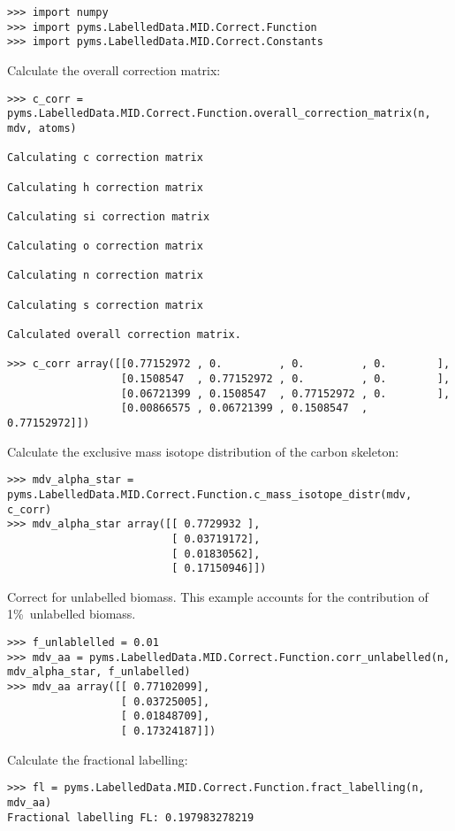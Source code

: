\begin{verbatim}
>>> import numpy
>>> import pyms.LabelledData.MID.Correct.Function
>>> import pyms.LabelledData.MID.Correct.Constants
\end{verbatim}

Calculate the overall correction matrix:

\begin{verbatim}
>>> c_corr = pyms.LabelledData.MID.Correct.Function.overall_correction_matrix(n, mdv, atoms)

Calculating c correction matrix

Calculating h correction matrix

Calculating si correction matrix

Calculating o correction matrix

Calculating n correction matrix

Calculating s correction matrix

Calculated overall correction matrix.

>>> c_corr array([[0.77152972 , 0.         , 0.         , 0.        ],
                  [0.1508547  , 0.77152972 , 0.         , 0.        ],
                  [0.06721399 , 0.1508547  , 0.77152972 , 0.        ],
                  [0.00866575 , 0.06721399 , 0.1508547  , 0.77152972]])
\end{verbatim}

Calculate the exclusive mass isotope distribution of the carbon skeleton:

\begin{verbatim}
>>> mdv_alpha_star = pyms.LabelledData.MID.Correct.Function.c_mass_isotope_distr(mdv, c_corr)
>>> mdv_alpha_star array([[ 0.7729932 ],
                          [ 0.03719172],
                          [ 0.01830562],
                          [ 0.17150946]])
\end{verbatim}

Correct for unlabelled biomass. This example accounts for the contribution
of 1\%\ unlabelled biomass.

\begin{verbatim}
>>> f_unlablelled = 0.01 
>>> mdv_aa = pyms.LabelledData.MID.Correct.Function.corr_unlabelled(n, mdv_alpha_star, f_unlabelled)
>>> mdv_aa array([[ 0.77102099],
                  [ 0.03725005],
                  [ 0.01848709],
                  [ 0.17324187]])
\end{verbatim}

Calculate the fractional labelling:

\begin{verbatim}
>>> fl = pyms.LabelledData.MID.Correct.Function.fract_labelling(n, mdv_aa)
Fractional labelling FL: 0.197983278219
\end{verbatim}
